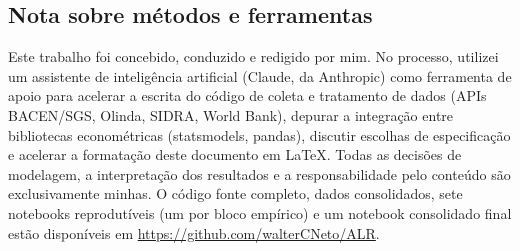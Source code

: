\documentclass[11pt,a4paper]{article}
\begin{document}
\subsection*{Nota sobre métodos e ferramentas}

Este trabalho foi concebido, conduzido e redigido por mim. No processo,
utilizei um assistente de inteligência artificial (Claude, da Anthropic)
como ferramenta de apoio para acelerar a escrita do código de coleta
e tratamento de dados (APIs BACEN/SGS, Olinda, SIDRA, World Bank),
depurar a integração entre bibliotecas econométricas (statsmodels,
pandas), discutir escolhas de especificação e acelerar a formatação
deste documento em \LaTeX. Todas as decisões de modelagem, a
interpretação dos resultados e a responsabilidade pelo conteúdo são
exclusivamente minhas. O código fonte completo, dados consolidados,
sete notebooks reprodutíveis (um por bloco empírico) e um notebook
consolidado final estão disponíveis em
\url{https://github.com/walterCNeto/ALR}.
\end{document}
